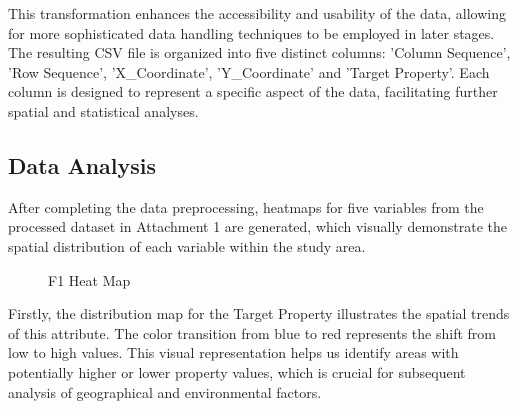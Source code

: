\documentclass{swmcmthesis}
\begin{document}
This transformation enhances the accessibility and usability of the data, allowing for more sophisticated data handling techniques to be employed in later stages. The resulting CSV file is organized into five distinct columns: 'Column Sequence', 'Row Sequence', 'X\_Coordinate', 'Y\_Coordinate' and 'Target Property'. Each column is designed to represent a specific aspect of the data, facilitating further spatial and statistical analyses. 

\subsection{Data Analysis}
After completing the data preprocessing, heatmaps for five variables from the processed dataset in Attachment 1 are generated, which visually demonstrate the spatial distribution of each variable within the study area.

\begin{figure}[h!t]
\centering
{}\hfill
{}
\caption{F1 Heat Map}
\end{figure}


Firstly, the distribution map for the Target Property illustrates the spatial trends of this attribute. The color transition from blue to red represents the shift from low to high values. This visual representation helps us identify areas with potentially higher or lower property values, which is crucial for subsequent analysis of geographical and environmental factors.
\end{document}
